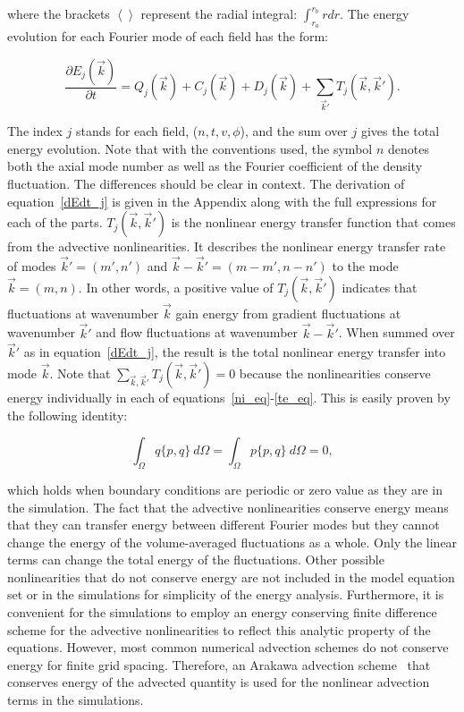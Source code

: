 \documentclass[showpacs,preprintnumbers,amsmath,amssymb,superscriptaddress,aip]{revtex4-1}
\def\beq{\begin{equation}}
\def\eeq{\end{equation}}
\newcommand{\pdiff}[2]{\frac{\partial#1}{\partial#2}}
\begin{document}
where the brackets $\left< \right>$ represent the radial integral: $\int_{r_a}^{r_b} r dr$. 
The energy evolution for each Fourier mode of each field has the form:

\beq
\label{dEdt_j}
\pdiff{E_{j}(\vec{k})}{t} = Q_{j}(\vec{k}) + C_{j}(\vec{k}) + D_j(\vec{k}) + \sum_{\vec{k}'} T_{j}(\vec{k},\vec{k}').
\eeq

The index $j$ stands for each field, ($n,t,v,\phi$), and the sum over $j$ gives the total energy evolution. 
Note that with the conventions used, the symbol $n$ denotes both the axial mode number as
well as the Fourier coefficient of the density fluctuation. The differences should be clear in context. The derivation of equation~\ref{dEdt_j} 
is given in the Appendix along with the full expressions for each of the parts. $T_{j}(\vec{k},\vec{k}')$ is the nonlinear energy transfer function that comes from the advective
nonlinearities.  It describes the nonlinear energy transfer rate of modes $\vec{k}'=(m',n')$ and $\vec{k}-\vec{k}'=(m-m',n-n')$ to the mode $\vec{k}=(m,n)$. 
In other words, a positive value of $T_{j}(\vec{k},\vec{k}')$ indicates that fluctuations
at wavenumber $\vec{k}$ gain energy from gradient fluctuations at wavenumber $\vec{k}'$ and flow fluctuations at wavenumber $\vec{k}-\vec{k}'$.
When summed over $\vec{k}'$ as in equation~\ref{dEdt_j}, the result is the total
nonlinear energy transfer into mode $\vec{k}$. 
Note that $\sum_{\vec{k},\vec{k}'} T_{j}(\vec{k},\vec{k}') = 0$ because the nonlinearities conserve energy individually in each of equations~\ref{ni_eq}-\ref{te_eq}.
This is easily proven by the following identity:

\beq
\label{poisson_rln}
\int_\Omega q \{p,q\} \ d\Omega = \int_\Omega p \{p,q\} \ d\Omega = 0,
\eeq

which holds when boundary conditions are periodic or zero value as they are in the simulation. 
The fact that the advective nonlinearities conserve energy means that they can transfer energy between different Fourier modes
but they cannot change the energy of the volume-averaged fluctuations
as a whole. Only the linear terms can change the total energy of the fluctuations.
Other possible nonlinearities that do not conserve energy are not
included in the model equation set or in the simulations for simplicity of the energy analysis. 
Furthermore, it is convenient for the simulations to employ an energy conserving finite difference
scheme for the advective nonlinearities to reflect this analytic property of the equations. 
However, most common numerical advection schemes do not conserve energy for finite grid spacing. Therefore, an Arakawa advection scheme~\cite{arakawa1966} that conserves 
energy of the advected quantity is used for the nonlinear advection terms in the simulations.
\end{document}
